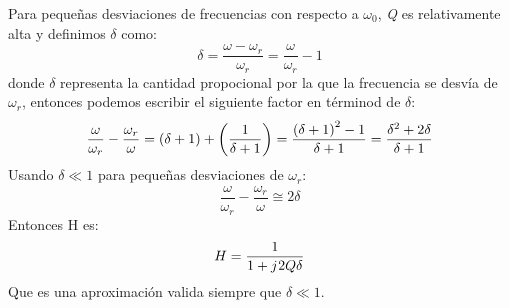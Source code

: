 \documentclass[
	12pt, %
	fleqn, %
	a4paper, %
	oneside, %
]{LegrandOrangeBook}
\begin{document}
Para pequeñas desviaciones de frecuencias con respecto a $\omega_0$, \textit{Q} es relativamente alta y definimos $\delta$ como:
\begin{displaymath}
\delta=\frac{\omega-\omega_r}{\omega_r}=\frac{\omega}{\omega_r}-1
\end{displaymath}
donde $\delta$ representa la cantidad propocional por la que la frecuencia se desvía de $\omega_r$, entonces podemos escribir el siguiente factor en términod de $\delta$:
\begin{displaymath}
\frac{\omega}{\omega_r}-\frac{\omega_r}{\omega}=\left(\delta+1\right)+\left(\frac{1}{\delta+1}\right)=\frac{\left(\delta+1\right)^2-1}{\delta+1}=\frac{\delta^2+2\delta}{\delta+1}
\end{displaymath}
Usando $\delta\ll 1$ para pequeñas desviaciones de $\omega_r$:
\begin{displaymath}
\frac{\omega}{\omega_r}-\frac{\omega_r}{\omega}\cong 2\delta
\end{displaymath}
Entonces H es:
\begin{equation}
H=\frac{1}{1+{j\mkern1mu} 2Q\delta}
\end{equation}
Que es una aproximación valida siempre que $\delta\ll 1$.
\end{document}
